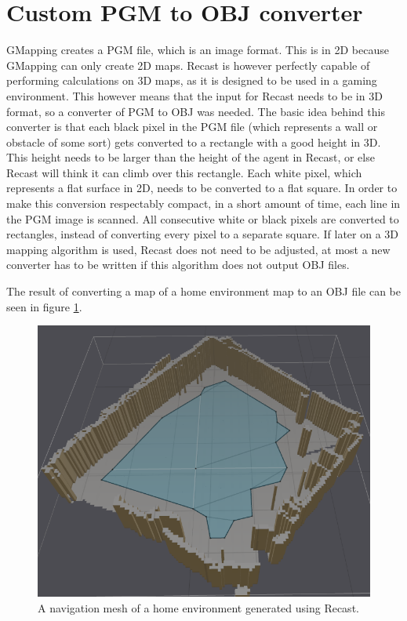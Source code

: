 \section{Custom PGM to OBJ converter}
GMapping creates a PGM file, which is an image format. This is in 2D because GMapping can only create 2D maps. Recast is however perfectly capable of performing calculations on 3D maps, as it is designed to be used in a gaming environment. This however means that the input for Recast needs to be in 3D format, so a converter of PGM to OBJ was needed. The basic idea behind this converter is that each black pixel in the PGM file (which represents a wall or obstacle of some sort) gets converted to a rectangle with a good height in 3D. This height needs to be larger than the height of the agent in Recast, or else Recast will think it can climb over this rectangle. Each white pixel, which represents a flat surface in 2D, needs to be converted to a flat square. In order to make this conversion respectably compact, in a short amount of time, each line in the PGM image is scanned. All consecutive white or black pixels are converted to rectangles, instead of converting every pixel to a separate square. If later on a 3D mapping algorithm is used, Recast does not need to be adjusted, at most a new converter has to be written if this algorithm does not output OBJ files.

The result of converting a map of a home environment map to an OBJ file can be seen in figure \ref{fig:navigation_mesh}.

\begin{figure}[ht!]
	\centering
	\mbox{\includegraphics[scale=0.2]{Images/navigation_mesh.png}}
	\caption{A navigation mesh of a home environment generated using Recast.}
	\label{fig:navigation_mesh}
\end{figure}

